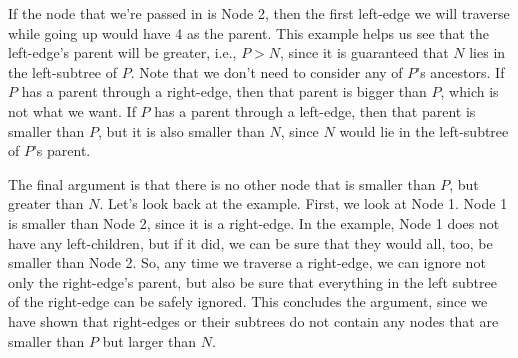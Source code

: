 \begin{solution}[2.5in]
If the node that we're passed in is Node 2, then the first left-edge we will
traverse while going up would have 4 as the parent. This example helps us see
that the left-edge's parent will be greater, i.e., $P>N$, since it is
guaranteed that $N$ lies in the left-subtree of $P$. Note that we don't need to
consider any of $P$'s ancestors. If $P$ has a parent through a right-edge, then
that parent is bigger than $P$, which is not what we want. If $P$ has a parent
through a left-edge, then that parent is smaller than $P$, but it is also
smaller than $N$, since $N$ would lie in the left-subtree of $P$'s parent.

The final argument is that there is no other node that is smaller than $P$, but
greater than $N$. Let's look back at the example. First, we look at Node 1.
Node 1 is smaller than Node 2, since it is a right-edge. In the example, Node 1
does not have any left-children, but if it did, we can be sure that they would
all, too, be smaller than Node 2. So, any time we traverse a right-edge, we can
ignore not only the right-edge's parent, but also be sure that everything in
the left subtree of the right-edge can be safely ignored. This concludes the
argument, since we have shown that right-edges or their subtrees do not contain
any nodes that are smaller than $P$ but larger than $N$.
\end{solution}
